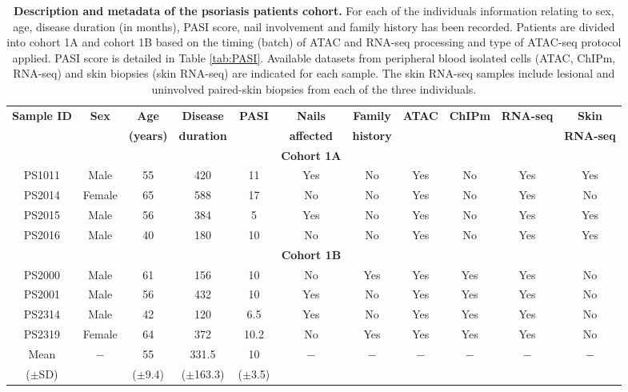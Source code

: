 \begin{landscape}
\renewcommand{\arraystretch}{0.7}
\begin{center}
\begin{longtable}[ht]{c c c c c c c c c c c}
\caption[Description and metadata of the psoriasis patients cohort.]{\textbf{Description and metadata of the psoriasis patients cohort.} For each of the individuals information relating to sex, age, disease duration (in months), PASI score, nail involvement and family history has been recorded. Patients are divided into cohort 1A and cohort 1B based on the timing (batch) of ATAC and RNA-seq processing and type of ATAC-seq protocol applied. PASI score is detailed in Table \ref{tab:PASI}. Available datasets from peripheral blood isolated cells (ATAC, ChIPm, RNA-seq) and skin biopsies (skin RNA-seq) are indicated for each sample. The skin RNA-seq samples include lesional and uninvolved paired-skin biopsies from each of the three individuals.}
\label{tab:Psoriasis_cohort_metadata} \\
\toprule
\textbf{Sample ID} & \textbf{Sex} & \textbf{Age}    & \textbf{Disease}  & \textbf{PASI}  &\textbf{Nails}      & \textbf{Family}  & \textbf{ATAC} & \textbf{ChIPm}& \textbf{RNA-seq} & \textbf{Skin}\\
                    &              & \textbf{(years)} & \textbf{duration} &                & \textbf{affected}  & \textbf{history} & & & & \textbf{RNA-seq} \\
\midrule
\midrule
& & & & & \textbf{Cohort 1A} & & & & & \\
\midrule
PS1011	& Male	 & 55 & 420 & 11	 & Yes	 & No & Yes& No& Yes& Yes\\
PS2014	& Female & 65	& 588	& 17	 & No	   & No & Yes& No& Yes& No\\
PS2015	& Male	 & 56	& 384	& 5	   & Yes   & No & Yes& No& Yes& Yes\\
PS2016	& Male	 & 40	& 180	& 10	 & No    & No & Yes& No& Yes& Yes\\
\midrule
\midrule
 & & & & &\textbf{Cohort 1B} & & & & & \\
\midrule
PS2000	& Male	 & 61	& 156	& 10	 & No	   & Yes & Yes& Yes& Yes& No\\
PS2001	& Male	 & 56	& 432	& 10	 & Yes	 & No  & Yes& Yes& Yes& No\\
PS2314	& Male	 & 42	& 120	& 6.5	 & Yes   & No  & Yes& Yes& Yes& No\\
PS2319	& Female & 64	& 372	& 10.2 & No    & Yes & Yes& Yes& Yes& No\\
\midrule
Mean		  & $-$	 & 55          & 331.5       & 10         & $-$   & $-$ & $-$ & $-$ & $-$ & $-$ \\
($\pm$SD) &      & ($\pm$9.4)  &($\pm$163.3) & ($\pm$3.5) &       &     &     &     &     &  \\																			
\bottomrule
\end{longtable}
\end{center}
\end{landscape}

